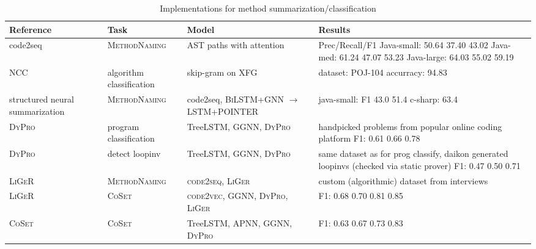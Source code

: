 \documentclass[sigconf,authordraft=true,nonacm=true]{acmart}
\begin{document}
\begin{table*}[t]
  \begin{tabularx}{\textwidth}{XllX}
    \toprule
    Reference                                  & Task & Model & Results \\
    \midrule
    code2seq~\cite{alon_code2seq_2019}         & \textsc{MethodNaming} & AST paths with attention
    & {
      Prec/Recall/F1 \newline
      Java-small: 50.64 37.40 43.02 \newline
      Java-med: 61.24 47.07 53.23 \newline
      Java-large: 64.03 55.02 59.19 \newline
    } \\
    NCC~\cite{ben-nun_neural_2018} & algorithm classification & skip-gram on XFG
    & {
      dataset: POJ-104 \newline
      accurracy: 94.83
    } \\
    structured neural \newline summarization~\cite{fernandes_structured_2020} & \textsc{MethodNaming} & code2seq, \textsc{BiLSTM+GNN $\to$ LSTM+POINTER}
    & {
      java-small: F1 43.0 51.4 \newline
      c-sharp: 63.4
    } \\
    \textsc{DyPro}~\cite{wang_learning_2019}   & program classification & TreeLSTM, GGNN, \textsc{DyPro}
    & {
      handpicked problems from popular online coding platform \newline
      F1: 0.61 0.66 0.78
    } \\
    \textsc{DyPro}~\cite{wang_learning_2019}   & detect loopinv & TreeLSTM, GGNN, \textsc{DyPro}
    & {
      same dataset as for prog classify, daikon generated loopinvs (checked via static prover) \newline
      F1: 0.47 0.50 0.71
    } \\
    \textsc{LiGeR}~\cite{wang_learning_2019-1} & \textsc{MethodNaming} & \textsc{code2seq}, \textsc{LiGer}
    & {
      custom (algorithmic) dataset from interviews \newline
    } \\
    \textsc{LiGeR}~\cite{wang_learning_2019-1} & \textsc{CoSet} & \textsc{code2vec}, \textsc{GGNN}, \textsc{DyPro}, \textsc{LiGer}
    & {
      F1: 0.68 0.70 0.81 0.85
    } \\
    \textsc{CoSet}~\cite{wang_coset_2019}      & \textsc{CoSet} & TreeLSTM, APNN, GGNN, \textsc{DyPro} & F1: 0.63 0.67 0.73 0.83 \\

    \bottomrule
  \end{tabularx}
  \caption{Implementations for method summarization/classification}
\end{table*}
\end{document}
